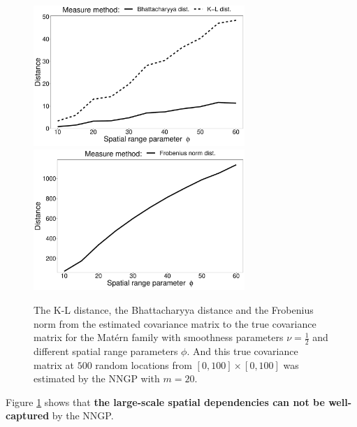 \documentclass[
12pt, %
a4paper, %
oneside, %
headinclude,footinclude, %
BCOR5mm, %
]{scrartcl}
\begin{document}
\begin{figure}[H]
{\includegraphics[width=8cm]{Figures/nnGP1.pdf} }
{\includegraphics[width=8cm]{Figures/nnGP2.pdf} }
\vspace{1em}
\caption{The K-L distance, the Bhattacharyya distance and the Frobenius norm from the estimated covariance
matrix to the true covariance matrix for the Matérn family with smoothness parameters $\nu = \frac{1}{2}$ and different spatial range parameters $\phi$. And this true covariance matrix at $500$ random locations from $[0, 100] \times [0, 100]$ was estimated by the NNGP with $m = 20$.}\label{fig:nnGP}
\end{figure}
Figure \ref{fig:nnGP} shows that \textbf{the large-scale spatial dependencies can not be well-captured} by the NNGP.
\end{document}
